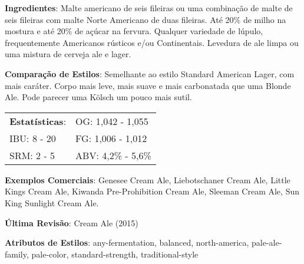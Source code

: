 \textbf{Ingredientes}: Malte americano de seis fileiras ou uma combinação de malte de seis fileiras com malte Norte Americano de duas fileiras. Até 20\% de milho na mostura e até 20\% de açúcar na fervura. Qualquer variedade de lúpulo, frequentemente Americanos rústicos e/ou Continentais. Levedura de ale limpa ou uma mistura de cerveja ale e lager.

\textbf{Comparação de Estilos}: Semelhante ao estilo Standard American Lager, com mais caráter. Corpo mais leve, mais suave e mais carbonatada que uma Blonde Ale. Pode parecer uma Kölsch um pouco mais sutil.

\begin{tabular}{@{}p{35mm}p{35mm}@{}}
  \textbf{Estatísticas}: & OG: 1,042 - 1,055 \\
  IBU: 8 - 20  & FG: 1,006 - 1,012 \\
  SRM: 2 - 5  & ABV: 4,2\% - 5,6\%
\end{tabular}

\textbf{Exemplos Comerciais}: Genesee Cream Ale, Liebotschaner Cream Ale, Little Kings Cream Ale, Kiwanda Pre-Prohibition Cream Ale, Sleeman Cream Ale, Sun King Sunlight Cream Ale.

\textbf{Última Revisão}: Cream Ale (2015)

\textbf{Atributos de Estilos}: any-fermentation, balanced, north-america, pale-ale-family, pale-color, standard-strength, traditional-style

